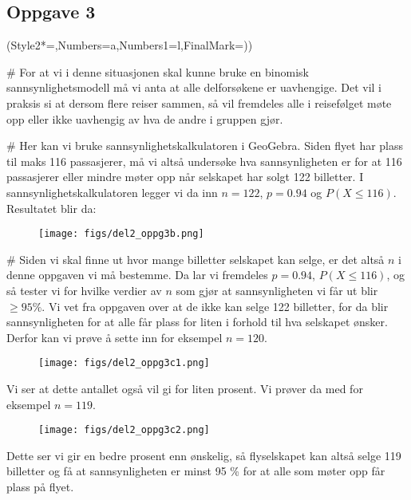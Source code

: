 \subsection*{Oppgave 3}
\begin{easylist}[enumerate]
	\ListProperties(Style2*=,Numbers=a,Numbers1=l,FinalMark={)})
	
	# For at vi i denne situasjonen skal kunne bruke en binomisk sannsynlighetsmodell må vi anta at alle delforsøkene er uavhengige. 
	Det vil i praksis si at dersom flere reiser sammen, så vil fremdeles alle i reisefølget møte opp eller ikke uavhengig av hva de andre i gruppen gjør.
	
	# Her kan vi bruke sannsynlighetskalkulatoren i GeoGebra. 
	Siden flyet har plass til maks 116 passasjerer, må vi altså undersøke hva sannsynligheten er for at 116 passasjerer eller mindre møter opp når selskapet har solgt 122 billetter. 
	I sannsynlighetskalkulatoren legger vi da inn $n = 122$, $p = 0.94$ og $P(X \leq 116)$. Resultatet blir da:
	\begin{figure}[ht!]
		\centering
		\texttt{[image: figs/del2\_oppg3b.png]}
		\label{fig:del2_oppg3b}
	\end{figure}
	

	# Siden vi skal finne ut hvor mange billetter selskapet kan selge, er det altså $n$ i denne oppgaven vi må bestemme. Da lar vi fremdeles $p = 0.94$, $P(X \leq 116)$, og så tester vi for hvilke verdier av $n$ som gjør at sannsynligheten vi får ut blir $\geq 95\% $. Vi vet fra oppgaven over at de ikke kan selge 122 billetter, for da blir sannsynligheten for at alle får plass for liten i forhold til hva selskapet ønsker. Derfor kan vi prøve å sette inn for eksempel $n = 120$.
	\begin{figure}[ht!]
		\centering
		\texttt{[image: figs/del2\_oppg3c1.png]}
	\end{figure}
	
	Vi ser at dette antallet også vil gi for liten prosent. Vi prøver da med for eksempel $n = 119$.
	
	\begin{figure}[ht!]
		\centering
		\texttt{[image: figs/del2\_oppg3c2.png]}
	\end{figure}
	
	Dette ser vi gir en bedre prosent enn ønskelig, så flyselskapet kan altså selge 119 billetter og få at sannsynligheten er minst 95 \% for at alle som møter opp får plass på flyet.	
	
	
\end{easylist}

